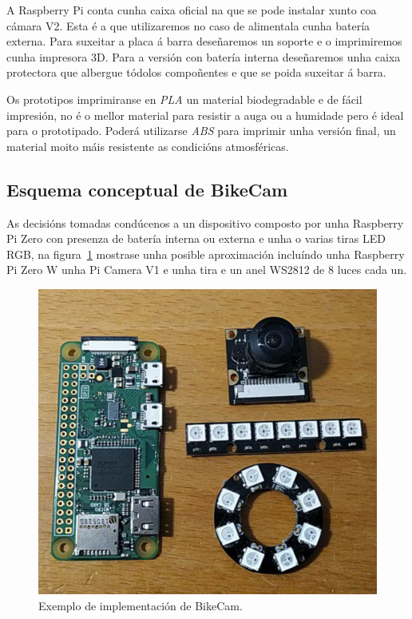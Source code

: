 A Raspberry Pi conta cunha caixa oficial na que se pode instalar xunto coa cámara V2. Esta é a que utilizaremos no caso de alimentala cunha batería externa. Para suxeitar a placa á barra deseñaremos un soporte e o imprimiremos cunha impresora 3D. Para a versión con batería interna deseñaremos unha caixa protectora que albergue tódolos compoñentes e que se poida suxeitar á barra.

Os prototipos imprimiranse en \emph{PLA} un material biodegradable e de fácil impresión, no é o mellor material para resistir a auga ou a humidade pero é ideal para o prototipado. Poderá utilizarse \emph{ABS} para imprimir unha versión final, un material moito máis resistente as condicións atmosféricas.

\subsection{Esquema conceptual de BikeCam}

As decisións tomadas condúcenos a un dispositivo composto por unha Raspberry Pi Zero con presenza de batería interna ou externa e unha o varias tiras LED RGB, na figura~\ref{fig:bikecam} mostrase unha posible aproximación incluíndo unha Raspberry Pi Zero W unha Pi Camera V1 e unha tira e un anel WS2812 de 8 luces cada un.
\begin{figure}[tbp]
  \centering
  \includegraphics[scale=0.4]{imaxes/bikecam.jpg}
  \caption{Exemplo de implementación de BikeCam.}
  \label{fig:bikecam}
\end{figure}
